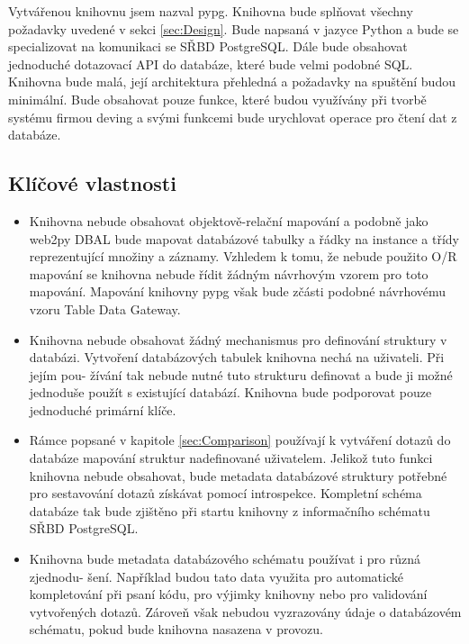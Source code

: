 \documentclass[ing,male,java,dept456]{diploma}						%
\begin{document}
Vytvářenou knihovnu jsem nazval pypg. Knihovna bude splňovat všechny požadavky uvedené v sekci \ref{sec:Design}. Bude napsaná v jazyce Python a bude se specializovat na komunikaci se SŘBD PostgreSQL. Dále bude obsahovat jednoduché dotazovací API do databáze, které bude velmi podobné SQL. Knihovna bude malá, její architektura přehledná a požadavky na spuštění budou minimální. Bude obsahovat pouze funkce, které budou využívány při tvorbě systému firmou deving a svými funkcemi bude urychlovat operace pro čtení dat z databáze. \\

\subsection{Klíčové vlastnosti}
\begin{itemize}
\item Knihovna nebude obsahovat objektově-relační mapování a podobně jako web2py DBAL bude mapovat databázové tabulky a řádky na instance a třídy reprezentující množiny a záznamy. Vzhledem k tomu, že nebude použito O/R mapování se knihovna nebude řídit žádným návrhovým vzorem pro toto mapování. Mapování knihovny pypg však bude zčásti podobné návrhovému vzoru Table Data Gateway. \\
\item Knihovna nebude obsahovat žádný mechanismus pro definování struktury v databázi. Vytvoření databázových tabulek knihovna nechá na uživateli. Při jejím pou- žívání tak nebude nutné tuto strukturu definovat a bude ji možné jednoduše použít s existující databází. Knihovna bude podporovat pouze jednoduché primární klíče. \\
\item Rámce popsané v kapitole \ref{sec:Comparison} používají k vytváření dotazů do databáze mapování struktur nadefinované uživatelem. Jelikož tuto funkci knihovna nebude obsahovat, bude metadata databázové struktury potřebné pro sestavování dotazů získávat pomocí introspekce. Kompletní schéma databáze tak bude zjištěno při startu knihovny z informačního schématu SŘBD PostgreSQL. \\
\item Knihovna bude metadata databázového schématu používat i pro různá zjednodu- šení. Například budou tato data využita pro automatické kompletování při psaní kódu, pro výjimky knihovny nebo pro validování vytvořených dotazů. Zároveň však nebudou vyzrazovány údaje o databázovém schématu, pokud bude knihovna nasazena v provozu. \\

\end{itemize}
\end{document}
